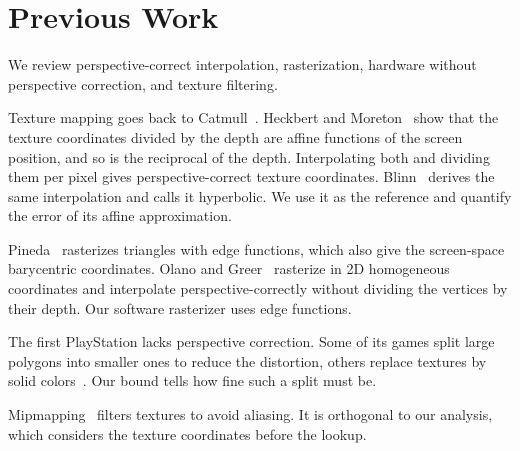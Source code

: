 \section{Previous Work}\label{sec:PreviousWork}
We review perspective-correct interpolation, rasterization, hardware without perspective correction, and texture filtering.

Texture mapping goes back to Catmull~\cite{Catmull74SAC}.
Heckbert and Moreton~\cite{Heckbert91IPT} show that the texture coordinates divided by the depth are affine functions of the screen position, and so is the reciprocal of the depth.
Interpolating both and dividing them per pixel gives perspective-correct texture coordinates.
Blinn~\cite{Blinn92HI} derives the same interpolation and calls it hyperbolic.
We use it as the reference and quantify the error of its affine approximation.

Pineda~\cite{Pineda88PAP} rasterizes triangles with edge functions, which also give the screen-space barycentric coordinates.
Olano and Greer~\cite{Olano97TSC} rasterize in 2D homogeneous coordinates and interpolate perspective-correctly without dividing the vertices by their depth.
Our software rasterizer uses edge functions.

The first PlayStation lacks perspective correction.
Some of its games split large polygons into smaller ones to reduce the distortion, others replace textures by solid colors~\cite{Copetti19PAP}.
Our bound tells how fine such a split must be.

Mipmapping~\cite{Williams83PP} filters textures to avoid aliasing.
It is orthogonal to our analysis, which considers the texture coordinates before the lookup.
